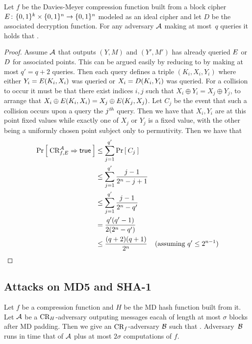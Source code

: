 \begin{theorem*}
Let $f$ be the Davies-Meyer compression function built from a block cipher
$E{{\kern .05em}\colon{\kern .05em}}\{0,1\}^k\times\{0,1\}^n\rightarrow\{0,1\}^n$ modeled as an ideal
cipher and let $D$ be the associated decryption function.
For any adversary ${\mathcal A}$ making at most~$q$ queries it holds that
\bnm
   \le {} \;.
\enm
\end{theorem*}

\begin{proof}
Assume ${\mathcal A}$ that outputs $(Y,M)$ and $(Y',M')$ has already queried $E$
or $D$ for associated points. This can be argued easily by reducing to
by making at most $q' = q+2$ queries.
Then each query defines a triple $(K_i,X_i,Y_i)$ where either $Y_i = E(K_i,X_i)$ was queried or $X_i =
D(K_i,Y_i)$ was queried. For a collision to occur it must be that there
exist indices $i,j$ such that $X_i \oplus Y_i = X_j \oplus Y_j$, to arrange that
$X_i \oplus E(K_i,X_i) = X_j \oplus E(K_j,X_j)$. Let $C_j$ be the
event that such a collision occurs upon a query the $j^{\textit{th}}$ query. Then we have
that $X_i,Y_i$ are at this point fixed values while exactly one of $X_j$ or
$Y_j$ is a fixed value, with the other being a uniformly chosen point subject
only to permutivity. Then we have that 
\begin{align*}
\Pr\left[\: \textnormal{CR}_{f,E}^{\mathcal A}\Rightarrow\mathsf{true} \:\right] 
    &\le \sum_{j=1}^{q'} \Pr\left[\: C_j \:\right]  &  \\
    &\le \sum_{j=1}^{q'} \frac{j-1}{2^n-j+1} &\\
    &\le \sum_{j=1}^{q'} \frac{j-1}{2^n-q'} &\\
    &= \frac{q'(q'-1)}{2(2^n-q')} & \\
    &\le \frac{(q+2)(q+1)}{2^n} &( \text{assuming }q' \leq 2^{n-1} ) \\
\end{align*}
\end{proof}

\subsection{Attacks on MD5 and SHA-1}



\begin{theorem*}
Let $f$ be a compression function and $H$ be the MD hash function built from it. 
Let ${\mathcal A}$ be a $\textnormal{CR}_H$-adversary outputing messages eacah of length at most $\sigma$
blocks after MD padding. Then we give an $\textnormal{CR}_f$-adversary ${\mathcal B}$
such that
\bnm
   \le {} \;.
\enm
Adversary~${\mathcal B}$ runs in time that of ${\mathcal A}$ plus at most $2\sigma$ computations of
$f$.
\end{theorem*}


